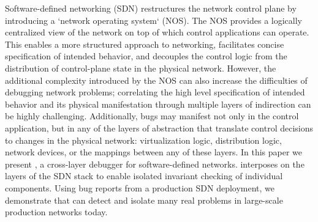 Software-defined networking (SDN) restructures the network control plane
by introducing a `network operating system` (NOS). The NOS provides
a logically centralized view of the network on top of which control
applications can operate. This enables a more structured approach to
networking, facilitates concise specification of intended behavior,
and decouples the control logic from the distribution of control-plane
state in the physical network.  However, the additional complexity
introduced by the NOS can also increase the difficulties of debugging
network problems; correlating the high level specification
of intended behavior and its physical manifestation through multiple
layers of indirection can be highly challenging. Additionally, bugs may manifest not only
in the control application, but in any of the layers of abstraction
that translate control decisions to changes in the physical network:
virtualization logic, distribution logic, network devices, or the mappings
between any of these layers. In this paper we present \projectname{},
a cross-layer debugger for software-defined networks. \projectname{}
interposes on the layers of the SDN stack to enable isolated invariant
checking of individual components. Using bug reports from a production
SDN deployment, we demonstrate that \projectname{} can detect and isolate
many real problems in large-scale production networks today.
